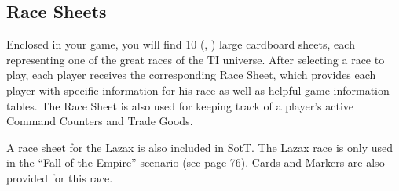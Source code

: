 \documentclass[11pt,fleqn]{book} %
\begin{document}
\subsection{Race Sheets}
Enclosed in your game, you will find 10 (, ) large cardboard sheets, each representing one of the great races of the TI universe. After selecting a race to play, each player receives the corresponding Race Sheet, which provides each player with specific information for his race as well as helpful game information tables. The Race Sheet is also used for keeping track of a player’s active Command Counters and Trade Goods.
\begin{STbox}
A race sheet for the Lazax is also included in SotT. The Lazax race is only used in the “Fall of the Empire” scenario (see page 76). Cards and Markers are also provided for this race.
\end{STbox}
\end{document}
